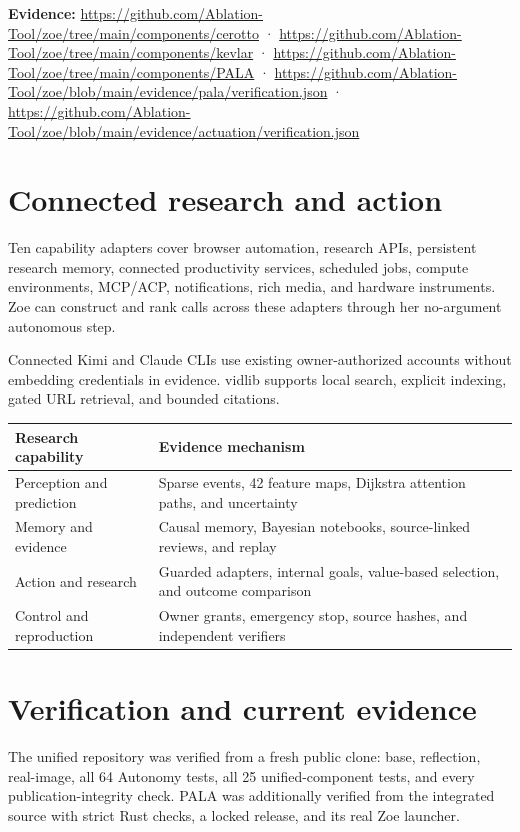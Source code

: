 \documentclass[11pt]{article}
\newcommand{\evidence}[1]{\par\smallskip\small\color{ZoeGray}\textbf{Evidence:} #1\normalsize\par\smallskip}
\begin{document}
\evidence{\url{https://github.com/Ablation-Tool/zoe/tree/main/components/cerotto} · \url{https://github.com/Ablation-Tool/zoe/tree/main/components/kevlar} · \url{https://github.com/Ablation-Tool/zoe/tree/main/components/PALA} · \url{https://github.com/Ablation-Tool/zoe/blob/main/evidence/pala/verification.json} · \url{https://github.com/Ablation-Tool/zoe/blob/main/evidence/actuation/verification.json}}

\clearpage
\section{Connected research and action}

Ten capability adapters cover browser automation, research APIs, persistent research memory, connected productivity services, scheduled jobs, compute environments, MCP/ACP, notifications, rich media, and hardware instruments. Zoe can construct and rank calls across these adapters through her no-argument autonomous step.

Connected Kimi and Claude CLIs use existing owner-authorized accounts without embedding credentials in evidence. vidlib supports local search, explicit indexing, gated URL retrieval, and bounded citations.

\begin{longtable}{p{}p{}}
\toprule
\textbf{Research capability} & \textbf{Evidence mechanism}\\
\midrule
Perception and prediction & Sparse events, 42 feature maps, Dijkstra attention paths, and uncertainty\\
Memory and evidence & Causal memory, Bayesian notebooks, source-linked reviews, and replay\\
Action and research & Guarded adapters, internal goals, value-based selection, and outcome comparison\\
Control and reproduction & Owner grants, emergency stop, source hashes, and independent verifiers\\
\bottomrule
\end{longtable}

\clearpage
\section{Verification and current evidence}

The unified repository was verified from a fresh public clone: base, reflection, real-image, all 64 Autonomy tests, all 25 unified-component tests, and every publication-integrity check. PALA was additionally verified from the integrated source with strict Rust checks, a locked release, and its real Zoe launcher.
\end{document}
